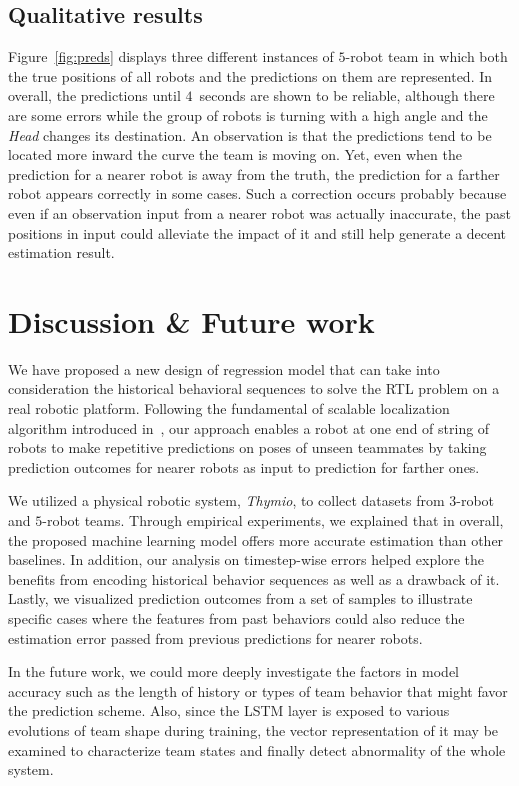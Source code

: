 \documentclass[letterpaper, 10 pt, conference]{ieeeconf}  %
\begin{document}
	\subsection{Qualitative results}
	\label{sec:qualitative_results}

	Figure~\ref{fig:preds} displays three different instances of $5$-robot team
	in which both the true positions of all robots and the predictions on them are represented.
	In overall, the predictions
	until $4$~seconds are shown to be reliable, although there are some errors while the
	group of robots is turning with a high angle and the \emph{Head} changes its destination.
	An observation is that the predictions tend to be located more inward the curve the team is moving on.
	Yet, even when the prediction for a nearer robot is away from the truth, the prediction
	for a farther robot appears correctly in some cases.
	Such a correction occurs probably because even if an observation input from a nearer robot was
	actually inaccurate, the past positions in input could alleviate the impact of it and still
	help generate a decent estimation result.


	\section{Discussion \& Future work}
	\label{sec:discussion_and_future_work}

	We have proposed a new design of regression model that can take into consideration
	the historical behavioral sequences to solve the RTL problem on a real robotic platform.
	Following the fundamental of scalable localization algorithm introduced in~\cite{CPR17},
	our approach enables a robot at one end of string of robots to make repetitive predictions
	on poses of unseen teammates by taking prediction outcomes for nearer robots as input to
	prediction for farther ones.

	We utilized a physical robotic system, \emph{Thymio}, to collect datasets from
	$3$-robot and $5$-robot teams. Through empirical experiments, we explained that in overall,
	the proposed machine learning model offers more accurate estimation than other baselines.
	In addition, our analysis on timestep-wise errors helped
	explore the benefits from encoding historical behavior sequences as well as a
	drawback of it. Lastly, we visualized prediction outcomes from a set of samples to
	illustrate specific cases where the features from past behaviors could also reduce the
	estimation error passed from previous predictions for nearer robots.

	In the future work, we could more deeply investigate the factors in model accuracy such as
	the length of history or types of team behavior that might favor the prediction scheme.
	Also, since the LSTM layer is exposed
	to various evolutions of team shape during training, the vector representation of it
	may be examined to characterize team states and finally detect abnormality of the whole
	system.


{\small
	
	
}
\end{document}
